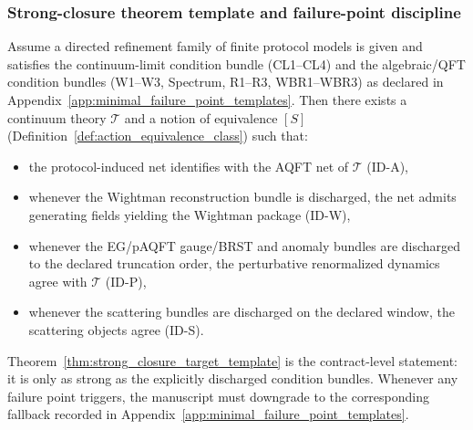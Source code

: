 \subsubsection{Strong-closure theorem template and failure-point discipline}
\begin{theorem}
\label{thm:strong_closure_target_template}
\MathTag Assume a directed refinement family of finite protocol models is given and satisfies the continuum-limit condition bundle (CL1--CL4) and the algebraic/QFT condition bundles (W1--W3, Spectrum, R1--R3, WBR1--WBR3) as declared in Appendix~\ref{app:minimal_failure_point_templates}.
Then there exists a continuum theory $\mathcal{T}$ and a notion of equivalence $[S]$ (Definition~\ref{def:action_equivalence_class}) such that:
\begin{itemize}
\item the protocol-induced net identifies with the AQFT net of $\mathcal{T}$ (ID-A),
\item whenever the Wightman reconstruction bundle is discharged, the net admits generating fields yielding the Wightman package (ID-W),
\item whenever the EG/pAQFT gauge/BRST and anomaly bundles are discharged to the declared truncation order, the perturbative renormalized dynamics agree with $\mathcal{T}$ (ID-P),
\item whenever the scattering bundles are discharged on the declared window, the scattering objects agree (ID-S).
\end{itemize}
\end{theorem}

\AuditTag Theorem~\ref{thm:strong_closure_target_template} is the contract-level statement: it is only as strong as the explicitly discharged condition bundles.
Whenever any failure point triggers, the manuscript must downgrade to the corresponding fallback recorded in Appendix~\ref{app:minimal_failure_point_templates}.

